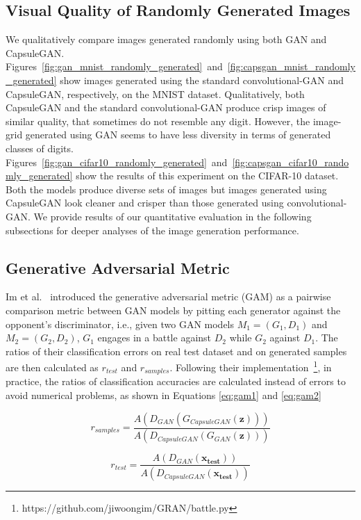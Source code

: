 \subsection{Visual Quality of Randomly Generated Images}

We qualitatively compare images generated randomly using both GAN and CapsuleGAN. Figures~\ref{fig:gan_mnist_randomly_generated}~and~\ref{fig:capsgan_mnist_randomly_generated} show images generated using the standard convolutional-GAN and CapsuleGAN, respectively, on the MNIST dataset. Qualitatively, both CapsuleGAN and the standard convolutional-GAN produce crisp images of similar quality, that sometimes do not resemble any digit. However, the image-grid generated using GAN seems to have less diversity in terms of generated classes of digits. Figures~\ref{fig:gan_cifar10_randomly_generated}~and~\ref{fig:capsgan_cifar10_randomly_generated} show the results of this experiment on the CIFAR-10 dataset. Both the models produce diverse sets of images but images generated using CapsuleGAN look cleaner and crisper than those generated using convolutional-GAN. We provide results of our quantitative evaluation in the following subsections for deeper analyses of the image generation performance.

\subsection{Generative Adversarial Metric}

Im et al.~\cite{bib:gam} introduced the generative adversarial metric (GAM) as a pairwise comparison metric between GAN models by pitting each generator against the opponent's discriminator, i.e., given two GAN models $M_1 = (G_1, D_1)$ and $M_2 = (G_2, D_2)$, $G_1$ engages in a battle against $D_2$ while $G_2$ against $D_1$. The ratios of their classification errors on real test dataset and on generated samples are then calculated as $r_{test}$ and $r_{samples}$. Following their implementation~\footnote{https://github.com/jiwoongim/GRAN/battle.py}, in practice, the ratios of classification accuracies are calculated instead of errors to avoid numerical problems, as shown in Equations \ref{eq:gam1} and \ref{eq:gam2}

\begin{equation}\label{eq:gam1}
r_{samples} = \frac{A(D_{GAN}(G_{CapsuleGAN}(\mathbf{z})))}{A(D_{CapsuleGAN}(G_{GAN}(\mathbf{z})))}
\end{equation}

\begin{equation}\label{eq:gam2}
r_{test} = \frac{A(D_{GAN}(\mathbf{x_{test}}))}{A(D_{CapsuleGAN}(\mathbf{x_{test}}))}
\end{equation}

